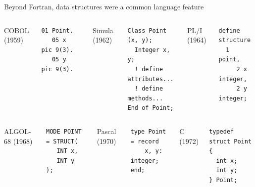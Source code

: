 \documentclass[aspectratio=169]{beamer}
\begin{document}



\begin{frame}[fragile]{Beyond Fortran, data structures were a common language feature}
\small
\vspace{0.5 cm}
\begin{columns}[t]
{\large COBOL (1959)}

\begin{verbatim}
01 Point.
   05 x    pic 9(3).
   05 y    pic 9(3).
\end{verbatim}

{\large Simula (1962)}

\begin{verbatim}
Class Point (x, y);
  Integer x, y;
  ! define attributes...
  ! define methods...
End of Point;
\end{verbatim}

{\large PL/I (1964)}

\begin{verbatim}
define structure
  1 point,
     2 x integer,
     2 y integer;
\end{verbatim}

\end{columns}

\vspace{1 cm}
\begin{columns}[t]
{\large ALGOL-68 (1968)}

\begin{verbatim}
MODE POINT = STRUCT(
   INT x,
   INT y
);
\end{verbatim}

{\large Pascal (1970)}

\begin{verbatim}
type Point = record
    x, y: integer;
end;
\end{verbatim}

{\large C (1972)}

\begin{verbatim}
typedef struct Point {
  int x;
  int y;
} Point;
\end{verbatim}

\end{columns}
\end{frame}
\end{document}
